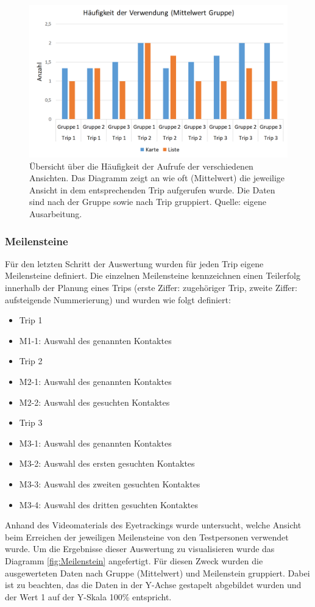 \documentclass[Bachelorarbeit.tex]{subfiles}
\begin{document}
\begin{figure}[H]
\centering
\includegraphics[width=0.7\linewidth]{img/Evaluation/Darstellungsformen/Haufigkeit}
\caption[Häufigkeit der der verwendeten Ansichten]{Übersicht über die Häufigkeit der Aufrufe der verschiedenen Ansichten. Das Diagramm zeigt an wie oft (Mittelwert) die jeweilige Ansicht in dem entsprechenden Trip aufgerufen wurde. Die Daten sind nach der Gruppe sowie nach Trip gruppiert. Quelle: eigene Ausarbeitung.}
\label{fig:Haufigkeit}
\end{figure}

\subsubsection{Meilensteine}
\label{Meilensteine} 
Für den letzten Schritt der Auswertung wurden für jeden Trip eigene Meilensteine definiert. 
Die einzelnen Meilensteine kennzeichnen einen Teilerfolg innerhalb der Planung eines Trips (erste Ziffer: zugehöriger Trip, zweite Ziffer: aufsteigende Nummerierung) und wurden wie folgt definiert:
\begin{itemize}
	\item Trip 1
	\item[] M1-1: Auswahl des genannten Kontaktes 
	\item Trip 2
	\item[] M2-1: Auswahl des genannten Kontaktes
	\item[] M2-2: Auswahl des gesuchten Kontaktes
	\item Trip 3
	\item[] M3-1: Auswahl des genannten Kontaktes
	\item[] M3-2: Auswahl des ersten gesuchten Kontaktes
	\item[] M3-3: Auswahl des zweiten gesuchten Kontaktes
	\item[] M3-4: Auswahl des dritten gesuchten Kontaktes
\end{itemize}
Anhand des Videomaterials des Eyetrackings wurde untersucht, welche Ansicht beim Erreichen der jeweiligen Meilensteine von den Testpersonen verwendet wurde. 
Um die Ergebnisse dieser Auswertung zu visualisieren wurde das Diagramm \ref{fig:Meilenstein} angefertigt. 
Für diesen Zweck wurden die ausgewerteten Daten nach Gruppe (Mittelwert) und Meilenstein gruppiert.
Dabei ist zu beachten, das die Daten in der Y-Achse gestapelt abgebildet wurden und der Wert 1 auf der Y-Skala 100\% entspricht. 
\end{document}
